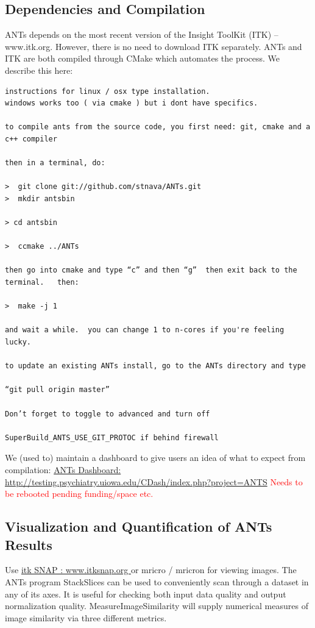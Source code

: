 \documentclass{InsightArticle}
\begin{document}
\subsection{Dependencies and Compilation}
ANTs depends on the most recent version of the Insight ToolKit (ITK)
-- www.itk.org.  However, there is no need to download ITK separately.
ANTs and ITK are both compiled through CMake which automates the
process.  We describe this here: 
\begin{verbatim}
instructions for linux / osx type installation.   
windows works too ( via cmake ) but i dont have specifics.

to compile ants from the source code, you first need: git, cmake and a c++ compiler

then in a terminal, do:

>  git clone git://github.com/stnava/ANTs.git
>  mkdir antsbin

> cd antsbin

>  ccmake ../ANTs

then go into cmake and type “c” and then “g”  then exit back to the
terminal.   then:

>  make -j 1

and wait a while.  you can change 1 to n-cores if you're feeling lucky.

to update an existing ANTs install, go to the ANTs directory and type 

“git pull origin master”

Don’t forget to toggle to advanced and turn off

SuperBuild_ANTS_USE_GIT_PROTOC if behind firewall
\end{verbatim}
We (used to) maintain a dashboard to give users an idea of what to expect 
from compilation:\newline
\href{http://testing.psychiatry.uiowa.edu/CDash/index.php?project=ANTS}{ANTs
Dashboard: http://testing.psychiatry.uiowa.edu/CDash/index.php?project=ANTS}
\textcolor{red}{Needs to be rebooted pending funding/space etc.}

\subsection{Visualization and Quantification of ANTs Results}
Use \href{www.itksnap.org}{itk SNAP : www.itksnap.org } or mricro / mricron for viewing
images.  The ANTs program StackSlices can be used to conveniently scan
through a dataset in any of its axes.  It is useful for checking both
input data quality and output normalization quality.  MeasureImageSimilarity 
will supply numerical measures of image similarity via three different metrics. 
\end{document}
